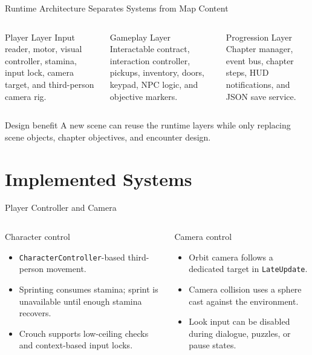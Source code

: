 \documentclass[aspectratio=169,10pt]{beamer}
\begin{document}
\begin{frame}{Runtime Architecture Separates Systems from Map Content}
  \begin{columns}[T,onlytextwidth]
    \begin{block}{Player Layer}
      Input reader, motor, visual controller, stamina, input lock, camera target, and third-person camera rig.
    \end{block}
    \begin{block}{Gameplay Layer}
      Interactable contract, interaction controller, pickups, inventory, doors, keypad, NPC logic, and objective markers.
    \end{block}
    \begin{block}{Progression Layer}
      Chapter manager, event bus, chapter steps, HUD notifications, and JSON save service.
    \end{block}
  \end{columns}

  \vspace{0.35cm}
  \begin{alertblock}{Design benefit}
    A new scene can reuse the runtime layers while only replacing scene objects, chapter objectives, and encounter design.
  \end{alertblock}
\end{frame}

\section{Implemented Systems}
\begin{frame}{Player Controller and Camera}
  \begin{columns}[T,onlytextwidth]
    \begin{block}{Character control}
      \begin{itemize}
        \item \texttt{CharacterController}-based third-person movement.
        \item Sprinting consumes stamina; sprint is unavailable until enough stamina recovers.
        \item Crouch supports low-ceiling checks and context-based input locks.
      \end{itemize}
    \end{block}
    \begin{block}{Camera control}
      \begin{itemize}
        \item Orbit camera follows a dedicated target in \texttt{LateUpdate}.
        \item Camera collision uses a sphere cast against the environment.
        \item Look input can be disabled during dialogue, puzzles, or pause states.
      \end{itemize}
    \end{block}
  \end{columns}
\end{frame}
\end{document}
